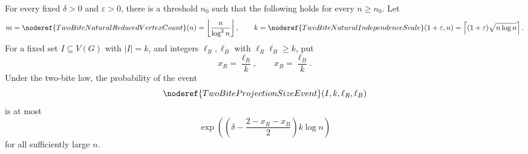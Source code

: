 \begin{lemma}
For every fixed \(\delta>0\) and \(\varepsilon>0\), there is a threshold
\(n_0\) such that the following holds for every \(n\ge n_0\).  Let
\[
m=\noderef{TwoBiteNaturalReducedVertexCount}(n)
=\left\lfloor\frac{n}{\log^2 n}\right\rfloor,
\qquad
k=\noderef{TwoBiteNaturalIndependenceScale}(1+\varepsilon,n)
  =\left\lceil(1+\varepsilon)\sqrt{n\log n}\right\rceil .
\]
For a fixed set \(I\subseteq V(G)\) with \(|I|=k\), and integers
\(\ell_R,\ell_B\) with \(\ell_R\ell_B\ge k\), put
\[
x_R=\frac{\ell_R}{k},\qquad x_B=\frac{\ell_B}{k}.
\]
Under the two-bite law, the probability of the event
\[
\noderef{TwoBiteProjectionSizeEvent}(I,k,\ell_R,\ell_B)
\]
is at most
\[
\exp\left(\left(\delta-\frac{2-x_R-x_B}{2}\right)k\log n\right)
\]
for all sufficiently large \(n\).
\end{lemma}
